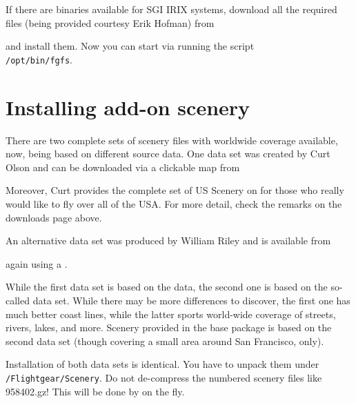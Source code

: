 If there are binaries available for SGI IRIX systems, download all the required files (being provided courtesy Erik Hofman)
from
 \medskip

 \medskip

 \noindent
 and install them. Now you can start \FlightGear{} via running the script\\
\texttt{/opt/bin/fgfs}.

\section{Installing add-on scenery}

There are two complete sets of scenery files with worldwide coverage available, now, being based on different source data. One data set was created by Curt Olson and can be downloaded via a clickable map from
 \medskip

 \medskip

 \noindent
Moreover, Curt provides the complete set of US Scenery on  for those who
really would like to fly over all of the USA. For more detail, check the remarks on the
downloads page above.

An alternative data set was produced by William Riley and is available from
\medskip

 \medskip

 \noindent
again using a .

While the first data set is based on the  data, the second one is based on the so-called  data set. While there may be more differences to discover, the first one has much better coast lines, while the latter sports world-wide coverage of streets, rivers, lakes, and more. Scenery provided in the base package is based on the second data set (though covering a small area around San Francisco, only).

Installation of both data sets is identical. You have to unpack them under \texttt{/Flightgear/Scenery}. Do not de-compress the numbered scenery files like 958402.gz! This will be done by \FlightGear{} on the fly.

